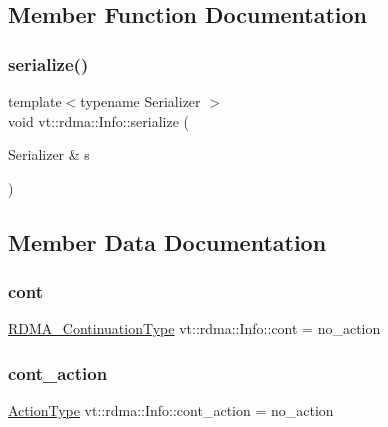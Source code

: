 \subsection{Member Function Documentation}
\mbox{\label{structvt_1_1rdma_1_1_info_ac1e3590cb31c738ed6d3cedce09701c6}} 
\subsubsection{\texorpdfstring{serialize()}{serialize()}}
{\footnotesize\ttfamily template$<$typename Serializer $>$ \\
void vt\+::rdma\+::\+Info\+::serialize (\begin{DoxyParamCaption}\item[{Serializer \&}]{s }\end{DoxyParamCaption})\hspace{0.3cm}{\ttfamily [inline]}}



\subsection{Member Data Documentation}
\mbox{\label{structvt_1_1rdma_1_1_info_a6831ea562dafc8261c3cb2274a519b6b}} 
\subsubsection{\texorpdfstring{cont}{cont}}
{\footnotesize\ttfamily \hyperlink{namespacevt_a9880273f1697d78c2171f8d8f044de51}{R\+D\+M\+A\+\_\+\+Continuation\+Type} vt\+::rdma\+::\+Info\+::cont = no\+\_\+action}

\mbox{\label{structvt_1_1rdma_1_1_info_a402c9b74d2c6d2135630a3fbbc738ce8}} 
\subsubsection{\texorpdfstring{cont\+\_\+action}{cont\_action}}
{\footnotesize\ttfamily \hyperlink{namespacevt_ae0a5a7b18cc99d7b732cb4d44f46b0f3}{Action\+Type} vt\+::rdma\+::\+Info\+::cont\+\_\+action = no\+\_\+action}

